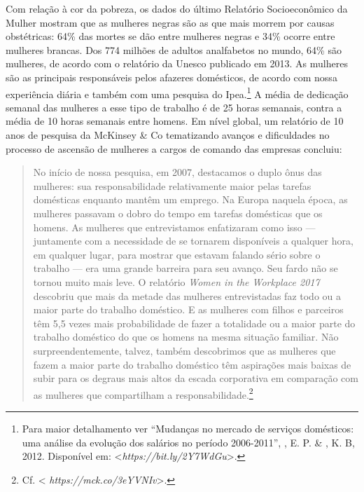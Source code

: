 Com relação à cor da pobreza, os dados do último Relatório
Socioeconômico da Mulher mostram que as mulheres negras são as que mais
morrem por causas obstétricas: 64\% das mortes se dão entre mulheres
negras e 34\% ocorre entre mulheres brancas. Dos 774 milhões de adultos
analfabetos no mundo, 64\% são mulheres, de acordo com o relatório da
Unesco publicado em 2013. As mulheres são as principais responsáveis
pelos afazeres domésticos, de acordo com nossa experiência diária e
também com uma pesquisa do Ipea.\footnote{Para maior detalhamento ver
  ``Mudanças no mercado de serviços domésticos: uma análise da evolução
  dos salários no período 2006-2011'', , E. P. \& , K. B,
  2012. Disponível em: \textless{}\emph{https://bit.ly/2Y7WdGu}\textgreater{}.} A
média de dedicação semanal das mulheres a esse tipo de trabalho é de 25
horas semanais, contra a média de 10 horas semanais entre homens. Em
nível global, um relatório de 10 anos de pesquisa da McKinsey \& Co
tematizando avanços e dificuldades no processo de ascensão de mulheres a
cargos de comando das empresas concluiu:

\begin{quote}
No início de nossa pesquisa, em 2007, destacamos o duplo ônus das
mulheres: sua responsabilidade relativamente maior pelas tarefas
domésticas enquanto mantêm um emprego. Na Europa naquela época, as
mulheres passavam o dobro do tempo em tarefas domésticas que os homens.
As mulheres que entrevistamos enfatizaram como isso --- juntamente com a
necessidade de se tornarem disponíveis a qualquer hora, em qualquer
lugar, para mostrar que estavam falando sério sobre o trabalho --- era uma
grande barreira para seu avanço. Seu fardo não se tornou muito mais
leve. O relatório \emph{Women in the Workplace 2017} descobriu que mais
da metade das mulheres entrevistadas faz todo ou a maior parte do
trabalho doméstico. E as mulheres com filhos e parceiros têm 5,5 vezes
mais probabilidade de fazer a totalidade ou a maior parte do trabalho
doméstico do que os homens na mesma situação familiar. Não
surpreendentemente, talvez, também descobrimos que as mulheres que fazem
a maior parte do trabalho doméstico têm aspirações mais baixas de subir
para os degraus mais altos da escada corporativa em comparação com as
mulheres que compartilham a responsabilidade.\footnote{Cf. \textless{}
  \emph{https://mck.co/3eYVNIv}\textgreater{}.}
\end{quote}

